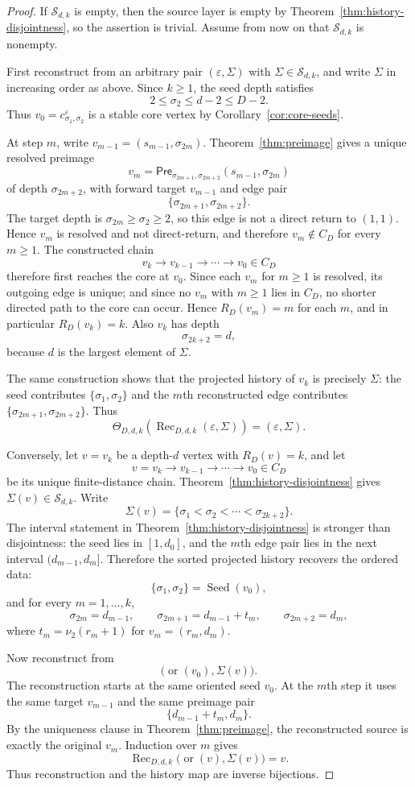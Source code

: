\documentclass[11pt]{article}
\theoremstyle{definition}
\theoremstyle{remark}
\newcommand{\nuu}{\nu_2}
\newcommand{\Pre}{\mathsf{Pre}}
\newcommand{\Sfam}{\mathcal S}
\newcommand{\Seed}{\operatorname{Seed}}
\begin{document}
\begin{proof}
If $\Sfam_{d,k}$ is empty, then the source layer is empty by Theorem~\ref{thm:history-disjointness}, so the assertion is trivial.  Assume from now on that $\Sfam_{d,k}$ is nonempty.

First reconstruct from an arbitrary pair $(\varepsilon,\Sigma)$ with $\Sigma\in\Sfam_{d,k}$, and write $\Sigma$ in increasing order as above.  Since $k\ge1$, the seed depth satisfies
\[
2\le\sigma_2\le d-2\le D-2.
\]
Thus $v_0=c^\varepsilon_{\sigma_1,\sigma_2}$ is a stable core vertex by Corollary~\ref{cor:core-seeds}.

At step $m$, write $v_{m-1}=(s_{m-1},\sigma_{2m})$.  Theorem~\ref{thm:preimage} gives a unique resolved preimage
\[
v_m=\Pre_{\sigma_{2m+1},\sigma_{2m+2}}(s_{m-1},\sigma_{2m})
\]
of depth $\sigma_{2m+2}$, with forward target $v_{m-1}$ and edge pair
\[
\{\sigma_{2m+1},\sigma_{2m+2}\}.
\]
The target depth is $\sigma_{2m}\ge\sigma_2\ge2$, so this edge is not a direct return to $(1,1)$.  Hence $v_m$ is resolved and not direct-return, and therefore $v_m\notin C_D$ for every $m\ge1$.  The constructed chain
\[
v_k\to v_{k-1}\to\cdots\to v_0\in C_D
\]
therefore first reaches the core at $v_0$.  Since each $v_m$ for $m\ge1$ is resolved, its outgoing edge is unique; and since no $v_m$ with $m\ge1$ lies in $C_D$, no shorter directed path to the core can occur.  Hence $R_D(v_m)=m$ for each $m$, and in particular $R_D(v_k)=k$.  Also $v_k$ has depth
\[
\sigma_{2k+2}=d,
\]
because $d$ is the largest element of $\Sigma$.

The same construction shows that the projected history of $v_k$ is precisely $\Sigma$: the seed contributes $\{\sigma_1,\sigma_2\}$ and the $m$th reconstructed edge contributes $\{\sigma_{2m+1},\sigma_{2m+2}\}$.  Thus
\[
\Theta_{D,d,k}(\operatorname{Rec}_{D,d,k}(\varepsilon,
\Sigma))=(\varepsilon,\Sigma).
\]

Conversely, let $v=v_k$ be a depth-$d$ vertex with $R_D(v)=k$, and let
\[
v=v_k\to v_{k-1}\to\cdots\to v_0\in C_D
\]
be its unique finite-distance chain.  Theorem~\ref{thm:history-disjointness} gives $\Sigma(v)\in\Sfam_{d,k}$.  Write
\[
\Sigma(v)=\{\sigma_1<\sigma_2<\cdots<\sigma_{2k+2}\}.
\]
The interval statement in Theorem~\ref{thm:history-disjointness} is stronger than disjointness: the seed lies in $[1,d_0]$, and the $m$th edge pair lies in the next interval $(d_{m-1},d_m]$.  Therefore the sorted projected history recovers the ordered data:
\[
\{\sigma_1,\sigma_2\}=\Seed(v_0),
\]
and for every $m=1,\ldots,k$,
\[
\sigma_{2m}=d_{m-1},
\qquad
\sigma_{2m+1}=d_{m-1}+t_m,
\qquad
\sigma_{2m+2}=d_m,
\]
where $t_m=\nuu(r_m+1)$ for $v_m=(r_m,d_m)$.

Now reconstruct from
\[
\bigl(\operatorname{or}(v_0),\Sigma(v)\bigr).
\]
The reconstruction starts at the same oriented seed $v_0$.  At the $m$th step it uses the same target $v_{m-1}$ and the same preimage pair
\[
\{d_{m-1}+t_m,d_m\}.
\]
By the uniqueness clause in Theorem~\ref{thm:preimage}, the reconstructed source is exactly the original $v_m$.  Induction over $m$ gives
\[
\operatorname{Rec}_{D,d,k}\bigl(\operatorname{or}(v),\Sigma(v)\bigr)=v.
\]
Thus reconstruction and the history map are inverse bijections.
\end{proof}
\end{document}
